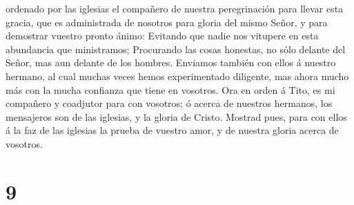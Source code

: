ordenado por las iglesias el compañero de nuestra peregrinación para
llevar esta gracia, que es administrada de nosotros para gloria del
mismo Señor, y para demostrar vuestro pronto ánimo: 
Evitando que nadie nos vitupere en esta abundancia que ministramos;
 Procurando las cosas honestas, no sólo delante del Señor,
mas aun delante de los hombres.  Enviamos también con ellos
á nuestro hermano, al cual muchas veces hemos experimentado diligente,
mas ahora mucho más con la mucha confianza que tiene en vosotros.
 Ora en orden á Tito, es mi compañero y coadjutor para con
vosotros; ó acerca de nuestros hermanos, los mensajeros son de las
iglesias, y la gloria de Cristo.  Mostrad pues, para con
ellos á la faz de las iglesias la prueba de vuestro amor, y de nuestra
gloria acerca de vosotros.

\hypertarget{section-8}{%
\section{9}\label{section-8}}

